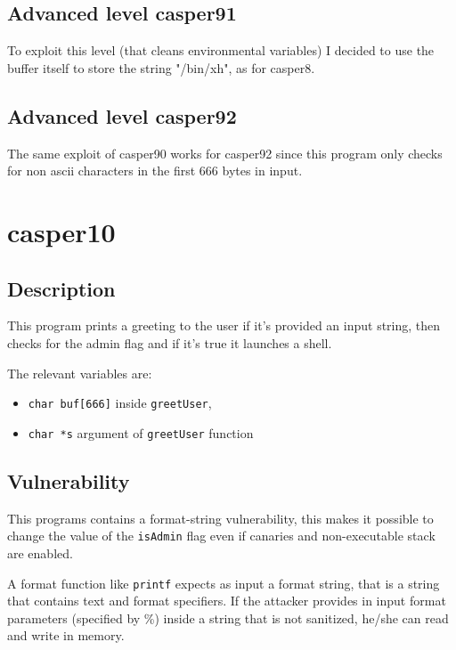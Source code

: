 \documentclass[a4paper,12pt]{article}
\begin{document}
\subsection{Advanced level casper91}

To exploit this level (that cleans environmental variables) I decided to use the buffer itself to store the string "/bin/xh", as for casper8.

\subsection{Advanced level casper92}
The same exploit of casper90 works for casper92 since this program only checks for non ascii characters in the first 666 bytes in input.





\section{casper10}

\subsection{Description}
This program prints a greeting to the user if it's provided an input string, then checks for the admin flag and if it's true it launches a shell. 

The relevant variables are:
\begin{itemize}

\item \texttt{char buf[666]} inside \texttt{greetUser},
\item \texttt{char *s} argument of \texttt{greetUser} function

\end{itemize}


\subsection{Vulnerability}

This programs contains a format-string vulnerability, this makes it possible to change the value of the \texttt{isAdmin} flag even if canaries and non-executable stack are enabled.

A format function like \texttt{printf} expects as input a format string, that is a string that contains text and format specifiers. If the attacker provides in input format parameters (specified by \%) inside a string that is not sanitized, he/she can read and write in memory. 
\end{document}
